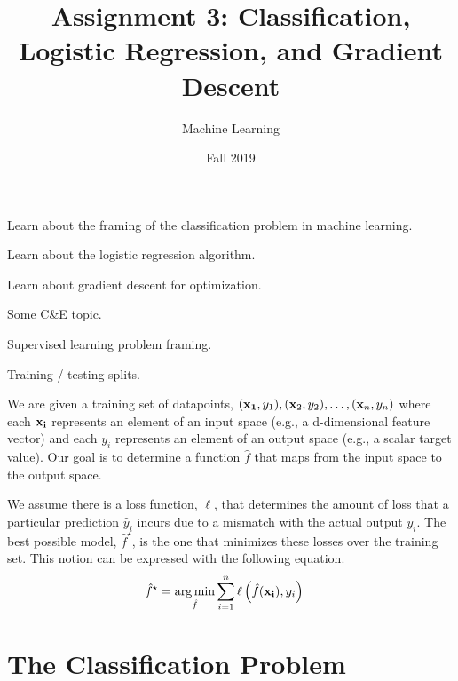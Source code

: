 \documentclass[assignment03_Solutions]{subfiles}
\title{Assignment 3: Classification, Logistic Regression, and Gradient Descent}
\author{Machine Learning}
\date{Fall 2019}
\begin{document}
\maketitle
\thispagestyle{firstpage}


\begin{learningobjectives}
\bi
\item Learn about the framing of the classification problem in machine learning.
\item Learn about the logistic regression algorithm.
\item Learn about gradient descent for optimization.
\item Some C\&E topic.
\ei
\end{learningobjectives}

\begin{priorknowledge}
\bi
\item Supervised learning problem framing.
\item Training / testing splits.
\ei
\end{priorknowledge}


\begin{recall}
We are given a training set of datapoints, $(\mathbf{x_1}, y_1), (\mathbf{x}_2, y_2), \ldots, (\mathbf{x}_n, y_n)$ where each $\mathbf{x_i}$ represents an element of an input space (e.g., a d-dimensional feature vector) and each $y_i$ represents an element of an output space (e.g., a scalar target value).  Our goal is to determine a function $\hat{f}$ that maps from the input space to the output space.

We assume there is a loss function, $\ell$, that determines the amount of loss that a particular prediction $\hat{y}_i$ incurs due to a mismatch with the actual output $y_i$.  The best possible model, $\hat{f}^\star$, is the one that minimizes these losses over the training set.  This notion can be expressed with the following equation.
\begin{align}
\hat{f}^\star &= \operatorname*{arg\,min}_{\hat{f}} \sum_{i=1}^n \ell \left ( \hat{f}(\mathbf{x_i}), y_i \right )
\end{align} 

\end{recall}

\vspace{1em}

\section{The Classification Problem}
\end{document}
